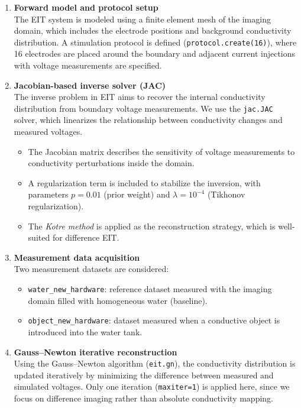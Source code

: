 \begin{enumerate}
    \item \textbf{Forward model and protocol setup} \\
    The EIT system is modeled using a finite element mesh of the imaging domain, which includes the electrode positions and background conductivity distribution. A stimulation protocol is defined (\texttt{protocol.create(16)}), where 16 electrodes are placed around the boundary and adjacent current injections with voltage measurements are specified.

    \item \textbf{Jacobian-based inverse solver (JAC)} \\
    The inverse problem in EIT aims to recover the internal conductivity distribution from boundary voltage measurements. We use the \texttt{jac.JAC} solver, which linearizes the relationship between conductivity changes and measured voltages.  
    \begin{itemize}
        \item The Jacobian matrix describes the sensitivity of voltage measurements to conductivity perturbations inside the domain.
        \item A regularization term is included to stabilize the inversion, with parameters $p = 0.01$ (prior weight) and $\lambda = 10^{-4}$ (Tikhonov regularization).
        \item The \emph{Kotre method} is applied as the reconstruction strategy, which is well-suited for difference EIT.
    \end{itemize}

    \item \textbf{Measurement data acquisition} \\
    Two measurement datasets are considered:
    \begin{itemize}
        \item \texttt{water\_new\_hardware}: reference dataset measured with the imaging domain filled with homogeneous water (baseline).
        \item \texttt{object\_new\_hardware}: dataset measured when a conductive object is introduced into the water tank.
    \end{itemize}

    \item \textbf{Gauss--Newton iterative reconstruction} \\
    Using the Gauss--Newton algorithm (\texttt{eit.gn}), the conductivity distribution is updated iteratively by minimizing the difference between measured and simulated voltages. Only one iteration (\texttt{maxiter=1}) is applied here, since we focus on difference imaging rather than absolute conductivity mapping.


\end{enumerate}
